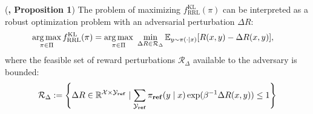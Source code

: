 \begin{theorem}(\textbf{\cite{brekelmans2022your}, Proposition 1})\label{theory:kl-minmax}
The problem of maximizing $f_\mathrm{RRL}^{\mathrm{KL}}(\pi)$ can be interpreted as a robust optimization problem with an adversarial perturbation $\Delta R$:
\begin{equation}
\begin{aligned}
\operatorname*{arg\,max}_{\pi \in \Pi} f_\mathrm{RRL}^{\mathrm{KL}}(\pi) 
&= \operatorname*{arg\,max}_{\pi \in \Pi} \,\, \min_{\Delta R \in \mathcal{R}_{\Delta}} \mathbb{E}_{y \sim \pi(\cdot \mid x)} [R(x,y) - \Delta R(x,y)],
\end{aligned}
\end{equation}
where the feasible set of reward perturbations $\mathcal{R}_{\Delta}$ available to the adversary is bounded: 
\begin{equation}
\mathcal{R}_{\Delta} := \left\{\Delta R \in \mathbb{R}^{\mathcal{X}\times\mathcal{Y}_{\textnormal{\textbf{ref}}}} \mid \sum_\mathcal{Y_{\textnormal{\textbf{ref}}}} \pi_{\textnormal{\textbf{ref}}}(y \mid x) \exp(\beta^{-1}\Delta R(x,y)) \leq 1\right\}
\label{eq:noisedomain}
\end{equation}
\end{theorem}

\

